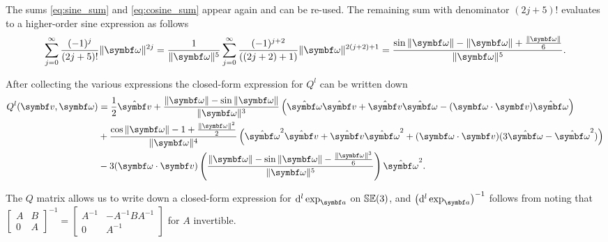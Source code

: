 The sums \eqref{eq:sine_sum} and \eqref{eq:cosine_sum} appear again and can be re-used. The remaining sum with denominator $(2j+5)!$ evaluates to a higher-order sine expression as follows
\begin{equation}
  \sum_{j=0}^\infty \frac{(-1)^j}{(2j+5)!} \| \bomega \|^{2j} = \frac{1}{\|\bomega\|^5} \sum_{j=0}^\infty \frac{(-1)^{j+2}}{((2j+2)+1)} \| \bomega \|^{2(j+2)+1} = \frac{\sin \|\bomega \| - \| \bomega \| + \frac{\|\bomega\|}{6}}{\| \bomega \|^5}.
\end{equation}
\begin{important}
  After collecting the various expressions the closed-form expression for $Q^l$ can be written down
  \begin{equation}
    \label{eq:se3_q_expr}
    \begin{aligned}
      Q^l (\bv, \bomega) & = \frac{1}{2}\hat \bv + \frac{\| \bomega \| - \sin \| \bomega \|}{\| \bomega \|^3}\left(\hat \bomega \hat \bv + \hat \bv \hat \bomega - (\bomega \cdot \bv) \hat \bomega \right)                     \\
                         & + \frac{ \cos \| \bomega \| - 1 + \frac{\|\bomega\|^2}{2} }{\| \bomega \|^4} \left(\hat \bomega^2 \hat \bv + \hat \bv \hat \bomega^2 + (\bomega \cdot \bv) (3 \hat \bomega - \hat \bomega^2) \right) \\
                         & - 3(\bomega \cdot \bv) \left(  \frac{\|\bomega\| - \sin \|\bomega\| - \frac{\|\bomega\|^3}{6}}{\|\bomega\|^5} \right) \hat \bomega^2 .
    \end{aligned}
  \end{equation}
\end{important}
The $Q$ matrix allows us to write down a closed-form expression for $\mathrm{d}^l \exp_\a$ on ${\mathbb{SE}(3)}$, and $\left( \mathrm{d}^l \exp_\a\right)^{-1}$ follows from noting that $\begin{bmatrix} A & B \\ 0 & A \end{bmatrix}^{-1} = \begin{bmatrix} A^{-1} & -A^{-1} B A^{-1} \\ 0 & A^{-1} \end{bmatrix}$ for $A$ invertible.

